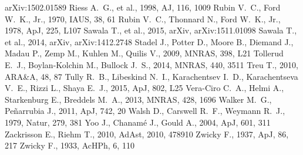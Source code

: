\documentclass[a4wide,12pt]{book}
\begin{document}
\begin{thebibliography}{}
arXiv:1502.01589 
Riess A.~G., et al., 1998, AJ, 116, 1009 
 Rubin V.~C., Ford W.~K., Jr., 1970, IAUS, 38, 61
 Rubin V.~C., Thonnard N., Ford W.~K., Jr., 1978, ApJ, 225, L107 
Sawala T., et al., 2015, arXiv, arXiv:1511.01098 
Sawala T., et al., 2014, arXiv, arXiv:1412.2748 
Stadel J., Potter D., Moore B., Diemand J., Madau P., Zemp M., Kuhlen M., 
Quilis V., 2009, MNRAS, 398, L21 
 Tollerud E.~J., Boylan-Kolchin M., Bullock J.~S., 2014, MNRAS, 440, 3511 
 Treu T., 2010, ARA\&A, 48, 87 
Tully R.~B., Libeskind N.~I., Karachentsev I.~D., Karachentseva V.~E., 
Rizzi L., Shaya E.~J., 2015, ApJ, 802, L25
 Vera-Ciro C.~A., Helmi A., Starkenburg E., 
Breddels M.~A., 2013, MNRAS, 428, 1696 
 Walker M.~G., Pe{\~n}arrubia J., 2011, ApJ, 742, 20  
 Walsh D., Carswell R.~F., Weymann R.~J., 1979, Natur, 279, 381 
 Yoo J., Chanam{\'e} J., Gould A., 2004, ApJ, 601, 311 
 Zackrisson E., Riehm T., 2010, AdAst, 2010, 478910 
 Zwicky 
F., 1937, ApJ, 86, 217 
 Zwicky 
F., 1933, AcHPh, 6, 110
\end{thebibliography}
\end{document}
